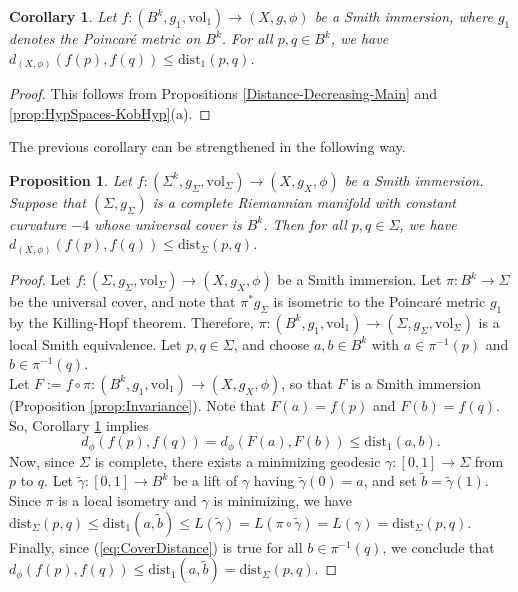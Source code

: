 \documentclass[11pt]{article}
\newcommand{\vol}{\mathrm{vol}}
\newtheorem{prop}[thm]{Proposition}
\newtheorem{cor}[thm]{Corollary}
\theoremstyle{definition}
\numberwithin{equation}{section}
\begin{document}
\begin{cor} \label{cor:Compare-Poincare-Dist} Let $f \colon (B^k, g_1, \vol_1) \to (X, g, \phi)$ be a Smith immersion, where $g_1$ denotes the Poincar\'{e} metric on $B^k$.  For all $p, q \in B^k$, we have $d_{(X,\phi)}(f(p), f(q)) \leq \mathrm{dist}_1(p,q)$.
\end{cor}

\begin{proof} This follows from Propositions \ref{Distance-Decreasing-Main} and \ref{prop:HypSpaces-KobHyp}(a).
\end{proof}

\indent The previous corollary can be strengthened in the following way.

\begin{prop} Let $f \colon (\Sigma^k, g_\Sigma, \vol_\Sigma) \to (X, g_X, \phi)$ be a Smith immersion. 
 Suppose that $(\Sigma, g_\Sigma)$ is a complete Riemannian manifold with constant curvature $-4$ whose universal cover is $B^k$.  Then for all $p,q \in \Sigma$, we have $d_{(X,\phi)}(f(p), f(q)) \leq \mathrm{dist}_\Sigma(p,q)$.
\end{prop} 

\begin{proof} Let $f \colon (\Sigma, g_\Sigma, \vol_\Sigma) \to (X, g_X, \phi)$ be a Smith immersion.  Let $\pi \colon B^k \to \Sigma$ be the universal cover, and note that $\pi^*g_\Sigma$ is isometric to the Poincar\'{e} metric $g_1$ by the Killing-Hopf theorem.  Therefore, $\pi \colon (B^k, g_1, \vol_1) \to (\Sigma, g_\Sigma, \vol_\Sigma)$ is a local Smith equivalence.  Let $p, q \in \Sigma$, and choose $a,b \in B^k$ with $a \in \pi^{-1}(p)$ and $b \in \pi^{-1}(q)$.   \\
\indent Let $F := f \circ \pi \colon (B^k, g_1, \vol_1) \to (X, g_X, \phi)$, so that $F$ is a Smith immersion (Proposition \ref{prop:Invariance}).  Note that $F(a) = f(p)$ and $F(b) = f(q)$.  So, Corollary \ref{cor:Compare-Poincare-Dist} implies
\begin{equation} \label{eq:CoverDistance}
d_\phi(f(p), f(q)) = d_\phi(F(a), F(b)) \leq \mathrm{dist}_1(a,b).
\end{equation}
Now, since $\Sigma$ is complete, there exists a minimizing geodesic $\gamma \colon [0,1] \to \Sigma$ from $p$ to $q$.  Let $\widetilde{\gamma} \colon [0,1] \to B^k$ be a lift of $\gamma$ having $\widetilde{\gamma}(0) = a$, and set $\widetilde{b} = \widetilde{\gamma}(1)$.  Since $\pi$ is a local isometry and $\gamma$ is minimizing, we have $\mathrm{dist}_\Sigma(p,q) \leq \mathrm{dist}_1(a, \widetilde{b}) \leq L(\widetilde{\gamma}) = L(\pi \circ \widetilde{\gamma}) = L(\gamma) = \mathrm{dist}_\Sigma(p,q)$.  Finally, since (\ref{eq:CoverDistance}) is true for all $b \in \pi^{-1}(q)$, we conclude that $d_\phi(f(p), f(q)) \leq \mathrm{dist}_1(a, \widetilde{b}) = \mathrm{dist}_\Sigma(p,q)$.
\end{proof}
\end{document}
